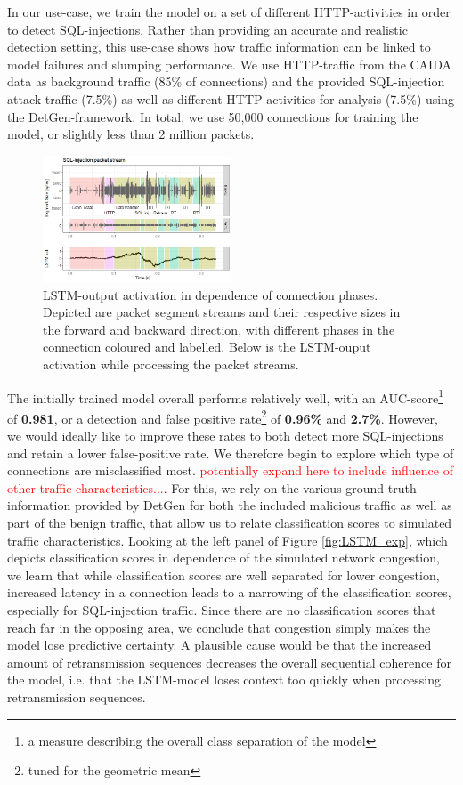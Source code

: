 \documentclass[conference]{IEEEtran}
\begin{document}
In our use-case, we train the model on a set of different HTTP-activities in order to detect SQL-injections. Rather than providing an accurate and realistic detection setting, this use-case shows how traffic information can be linked to model failures and slumping performance. We use HTTP-traffic from the CAIDA data as background traffic (85\% of connections) and the provided SQL-injection attack traffic (7.5\%) as well as different HTTP-activities for analysis (7.5\%) using the DetGen-framework. In total, we use 50,000 connections for training the model, or slightly less than 2 million packets. 


\begin{figure}
\centering
\includegraphics[width=0.5\textwidth]{images/LSTM_activation.png}
\caption{LSTM-output activation in dependence of connection phases. Depicted are packet segment streams and their respective sizes in the forward and backward direction, with different phases in the connection coloured and labelled. Below is the LSTM-ouput activation while processing the packet streams.}\label{fig:LSTM_act}
\end{figure}

The initially trained model overall performs relatively well, with an AUC-score\footnote{a measure describing the overall class separation of the model} of \textbf{0.981}, or a detection and false positive rate\footnote{tuned for the geometric mean} of \textbf{0.96\%} and \textbf{2.7\%}. However, we would ideally like to improve these rates to both detect more SQL-injections and retain a lower false-positive rate. We therefore begin to explore which type of connections are misclassified most. \textcolor{red}{potentially expand here to include influence of other traffic characteristics...}. For this, we rely on the various ground-truth information provided by DetGen for both the included malicious traffic as well as part of the benign traffic, that allow us to relate classification scores to simulated traffic characteristics. Looking at the left panel of Figure \ref{fig:LSTM_exp}, which depicts classification scores in dependence of the simulated network congestion, we learn that while classification scores are well separated for lower congestion, increased latency in a connection leads to a narrowing of the classification scores, especially for SQL-injection traffic. Since there are no classification scores that reach far in the opposing area, we conclude that congestion simply makes the model lose predictive certainty. A plausible cause would be that the increased amount of retransmission sequences decreases the overall sequential coherence for the model, i.e. that the LSTM-model loses context too quickly when processing retransmission sequences. 
\end{document}
